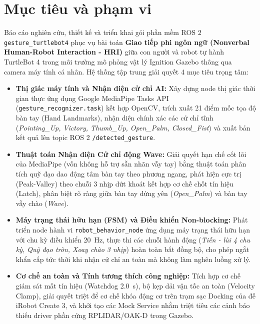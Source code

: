 \section{Mục tiêu và phạm vi}

Báo cáo nghiên cứu, thiết kế và triển khai gói phần mềm ROS 2 \texttt{gesture\_turtlebot4} phục vụ bài toán \textbf{Giao tiếp phi ngôn ngữ (Nonverbal Human-Robot Interaction - HRI)} giữa con người và robot tự hành TurtleBot 4 trong môi trường mô phỏng vật lý Ignition Gazebo thông qua camera máy tính cá nhân. Hệ thống tập trung giải quyết 4 mục tiêu trọng tâm:

\begin{itemize}
    \item \textbf{Thị giác máy tính và Nhận diện cử chỉ AI:} Xây dựng node thị giác thời gian thực ứng dụng Google MediaPipe Tasks API (\texttt{gesture\_recognizer.task}) kết hợp OpenCV, trích xuất 21 điểm mốc tọa độ bàn tay (Hand Landmarks), nhận diện chính xác các cử chỉ tĩnh (\textit{Pointing\_Up, Victory, Thumb\_Up, Open\_Palm, Closed\_Fist}) và xuất bản kết quả lên topic ROS 2 \texttt{/detected\_gesture}.
    \item \textbf{Thuật toán Nhận diện Cử chỉ động Wave:} Giải quyết hạn chế cốt lõi của MediaPipe (vốn không hỗ trợ sẵn nhãn vẫy tay) bằng thuật toán phân tích quỹ đạo dao động tâm bàn tay theo phương ngang, phát hiện cực trị (Peak-Valley) theo chuỗi 3 nhịp dứt khoát kết hợp cơ chế chốt tín hiệu (Latch), phân biệt rõ ràng giữa bàn tay dừng yên (\textit{Open\_Palm}) và bàn tay vẫy chào (\textit{Wave}).
    \item \textbf{Máy trạng thái hữu hạn (FSM) và Điều khiển Non-blocking:} Phát triển node hành vi \texttt{robot\_behavior_node} ứng dụng máy trạng thái hữu hạn với chu kỳ điều khiển \SI{20}{\hertz}, thực thi các chuỗi hành động (\textit{Tiến - lùi 4 chu kỳ, Quỹ đạo tròn, Xoay chào 3 nhịp}) hoàn toàn bất đồng bộ, cho phép ngắt khẩn cấp tức thời khi nhận cử chỉ an toàn mà không làm nghẽn luồng xử lý.
    \item \textbf{Cơ chế an toàn và Tính tương thích công nghiệp:} Tích hợp cơ chế giám sát mất tín hiệu (Watchdog \SI{2.0}{\second}), bộ kẹp dải vận tốc an toàn (Velocity Clamp), giải quyết triệt để cơ chế khóa động cơ trên trạm sạc Docking của đế iRobot Create 3, và khởi tạo các Mock Service nhằm triệt tiêu các cảnh báo thiếu driver phần cứng RPLIDAR/OAK-D trong Gazebo.
\end{itemize}

